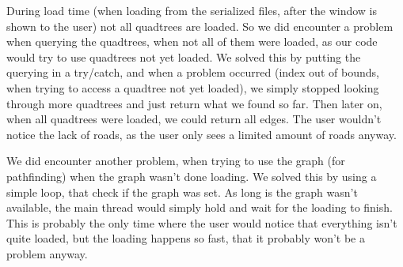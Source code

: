 During load time (when loading from the serialized files, after the window is shown to the 
user) not all quadtrees are loaded. So we did encounter a problem when querying the 
quadtrees, when not all of them were loaded, as our code would try to use quadtrees 
not yet loaded. We solved this by putting the querying in a try/catch, and when a problem 
occurred (index out of bounds, when trying to access a quadtree not yet loaded), we simply 
stopped looking through more quadtrees and just return what we found so far. Then later on, 
when all quadtrees were loaded, we could return all edges. The user wouldn't notice the lack 
of roads, as the user only sees a limited amount of roads anyway.

We did encounter another problem, when trying to use the graph (for pathfinding) when the 
graph wasn't done loading. We solved this by using a simple loop, that check if the graph was 
set. As long is the graph wasn't available, the main thread would simply hold and wait for the 
loading to finish. This is probably the only time where the user would notice that everything isn't 
quite loaded, but the loading happens so fast, that it probably won't be a problem anyway.
